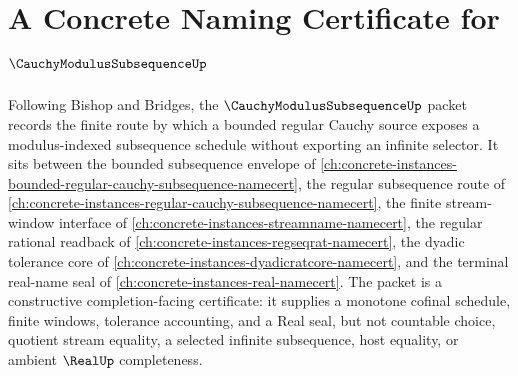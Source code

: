 \chapter{A Concrete Naming Certificate for $\CauchyModulusSubsequenceUp$}
\label{ch:concrete-instances-cauchy-modulus-subsequence-namecert}

Following Bishop and Bridges, the $\CauchyModulusSubsequenceUp$ packet records the finite route by which a bounded regular Cauchy source exposes a modulus-indexed subsequence schedule without exporting an infinite selector. It sits between the bounded subsequence envelope of \autoref{ch:concrete-instances-bounded-regular-cauchy-subsequence-namecert}, the regular subsequence route of \autoref{ch:concrete-instances-regular-cauchy-subsequence-namecert}, the finite stream-window interface of \autoref{ch:concrete-instances-streamname-namecert}, the regular rational readback of \autoref{ch:concrete-instances-regseqrat-namecert}, the dyadic tolerance core of \autoref{ch:concrete-instances-dyadicratcore-namecert}, and the terminal real-name seal of \autoref{ch:concrete-instances-real-namecert}. The packet is a constructive completion-facing certificate: it supplies a monotone cofinal schedule, finite windows, tolerance accounting, and a Real seal, but not countable choice, quotient stream equality, a selected infinite subsequence, host equality, or ambient $\RealUp$ completeness.

